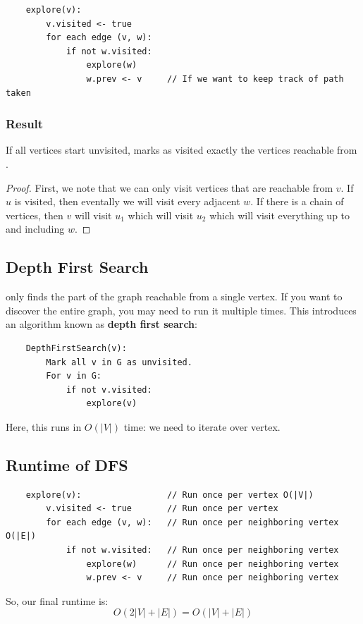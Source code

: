 \documentclass[letterpaper]{article}
\begin{document}
\begin{verbatim}
    explore(v):
        v.visited <- true 
        for each edge (v, w):
            if not w.visited:
                explore(w)
                w.prev <- v     // If we want to keep track of path taken
\end{verbatim}

\subsubsection{Result}
\begin{theorem}{}{}
    If all vertices start unvisited,  marks as visited exactly the vertices reachable from .
\end{theorem}

\begin{mdframed}[]
    \begin{proof}
        First, we note that we can only visit vertices that are reachable from $v$. If $u$ is visited, then eventally we will visit every adjacent $w$. If there is a chain of vertices, then $v$ will visit $u_1$ which will visit $u_2$ which will visit everything up to and including $w$. 
    \end{proof}
\end{mdframed}

\subsection{Depth First Search}
 only finds the part of the graph reachable from a single vertex. If you want to discover the entire graph, you may need to run it multiple times. This introduces an algorithm known as \textbf{depth first search}:
\begin{verbatim}
    DepthFirstSearch(v):
        Mark all v in G as unvisited. 
        For v in G:
            if not v.visited:
                explore(v)
\end{verbatim}
Here, this runs in $O(|V|)$ time: we need to iterate over vertex. 

\subsection{Runtime of DFS}
\begin{verbatim}
    explore(v):                 // Run once per vertex O(|V|) 
        v.visited <- true       // Run once per vertex 
        for each edge (v, w):   // Run once per neighboring vertex O(|E|)
            if not w.visited:   // Run once per neighboring vertex
                explore(w)      // Run once per neighboring vertex
                w.prev <- v     // Run once per neighboring vertex
\end{verbatim}
So, our final runtime is: 
\[O(2|V| + |E|) = O(|V| + |E|)\]
\end{document}
